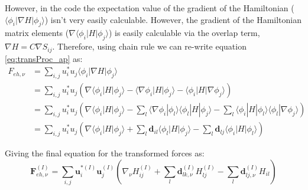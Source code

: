 However, in the code the expectation value of the gradient of the Hamiltonian ($\langle \phi_i | \nabla H | \phi_j \rangle$) isn't very easily calculable. However, the gradient of the Hamiltonian matrix elements ($\nabla \langle \phi_i | H | \phi_j \rangle$) is easily calculable via the overlap term, $\nabla H = C \nabla S_{ij}$. Therefore, using chain rule we can re-write equation \eqref{eq:transProc_ap} as:
\begin{align}
  F_{eh, \nu} &= \sum_{i, j} u_i^{*}  u_j \langle \phi_{i} | \nabla H | \phi_{j} \rangle \\
  &= \sum_{i, j} u_i^* u_j \left(\nabla \langle \phi_i| H | \phi_j \rangle - \langle \nabla \phi_i| H | \phi_j \rangle - \langle \phi_i| H | \nabla \phi_j \rangle \right) \\
  &= \sum_{i, j} u_i^* u_j \left(\nabla \langle \phi_i| H | \phi_j \rangle - \sum_{l}\langle \nabla \phi_i| \phi_l \rangle \langle \phi_l | H | \phi_j \rangle - \sum_l \langle \phi_i| H | \phi_l \rangle \langle \phi_l | \nabla \phi_j \rangle \right) \\
  &= \sum_{i, j} u_i^* u_j \left(\nabla \langle \phi_i| H | \phi_j \rangle + \sum_{l}\mathbf{d}_{il} \langle \phi_l | H | \phi_j \rangle - \sum_l \mathbf{d}_{lj} \langle \phi_i| H | \phi_l \rangle \right)
\end{align}

\noindent Giving the final equation for the transformed forces as:
\begin{equation}
  \mathbf{F}_{eh, \nu}^{(I)} = \sum_{i,j} \mathbf{u}_{i}^{*(I)} \mathbf{u}_{j}^{(I)} \left( \nabla_{\nu} H_{ij}^{(I)} + \sum_{l} \mathbf{d}_{lk, \nu}^{(I)} H_{lj}^{(I)} - \sum_{l} \mathbf{d}_{lj, \nu}^{(I)} H_{il} \right)
  \label{eq:ForceDiab_ap}
\end{equation}


